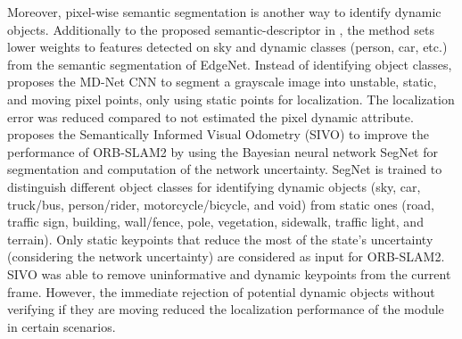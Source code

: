 Moreover, pixel-wise semantic segmentation is another way to identify dynamic objects.
Additionally to the proposed semantic-descriptor in \cite{singh-et-al:2021:9564866}, the method sets lower weights to features detected on sky and dynamic classes (person, car, etc.) from the semantic segmentation of EdgeNet.
Instead of identifying object classes, \cite{song-et-al:2019:8967749} proposes the MD-Net CNN to segment a grayscale image into unstable, static, and moving pixel points, only using static points for localization. The localization error was reduced compared to not estimated the pixel dynamic attribute.
\cite{ganti-waslander:2019:00024} proposes the Semantically Informed Visual Odometry (SIVO) to improve the performance of ORB-SLAM2 by using the Bayesian neural network SegNet for segmentation and computation of the network uncertainty. SegNet is trained to distinguish different object classes for identifying dynamic objects (sky, car, truck/bus, person/rider, motorcycle/bicycle, and void) from static ones (road, traffic sign, building, wall/fence, pole, vegetation, sidewalk, traffic light, and terrain). Only static keypoints that reduce the most of the state's uncertainty (considering the network uncertainty) are considered as input for ORB-SLAM2.
SIVO was able to remove uninformative and dynamic keypoints from the current frame. However, the immediate rejection of potential dynamic objects without verifying if they are moving reduced the localization performance of the module in certain scenarios.

